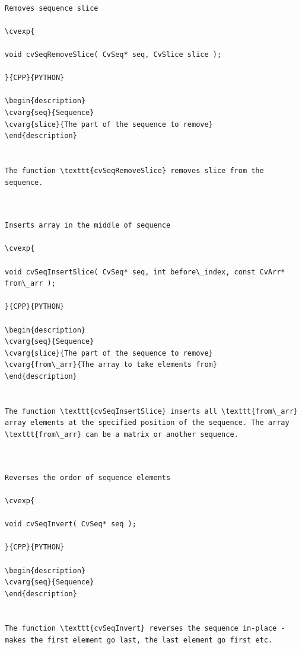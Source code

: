 \label{SeqRemoveSlice}
\begin{verbatim}

Removes sequence slice

\cvexp{

void cvSeqRemoveSlice( CvSeq* seq, CvSlice slice );

}{CPP}{PYTHON}

\begin{description}
\cvarg{seq}{Sequence}
\cvarg{slice}{The part of the sequence to remove}
\end{description}


The function \texttt{cvSeqRemoveSlice} removes slice from the sequence.


\end{verbatim}
\label{SeqInsertSlice}
\begin{verbatim}

Inserts array in the middle of sequence

\cvexp{

void cvSeqInsertSlice( CvSeq* seq, int before\_index, const CvArr* from\_arr );

}{CPP}{PYTHON}

\begin{description}
\cvarg{seq}{Sequence}
\cvarg{slice}{The part of the sequence to remove}
\cvarg{from\_arr}{The array to take elements from}
\end{description}


The function \texttt{cvSeqInsertSlice} inserts all \texttt{from\_arr} array elements at the specified position of the sequence. The array \texttt{from\_arr} can be a matrix or another sequence.


\end{verbatim}
\label{SeqInvert}
\begin{verbatim}

Reverses the order of sequence elements

\cvexp{

void cvSeqInvert( CvSeq* seq );

}{CPP}{PYTHON}

\begin{description}
\cvarg{seq}{Sequence}
\end{description}


The function \texttt{cvSeqInvert} reverses the sequence in-place - makes the first element go last, the last element go first etc.


\end{verbatim}
